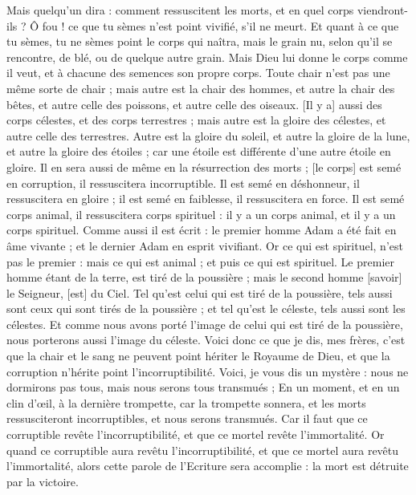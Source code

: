 \begin{multicols}{2}
Mais quelqu'un dira : comment ressuscitent les morts, et en quel corps viendront-ils ?
Ô fou ! ce que tu sèmes n'est point vivifié, s'il ne meurt.
Et quant à ce que tu sèmes, tu ne sèmes point le corps qui naîtra, mais le grain nu, selon qu'il se rencontre, de blé, ou de quelque autre grain.
Mais Dieu lui donne le corps comme il veut, et à chacune des semences son propre corps.
Toute chair n'est pas une même sorte de chair ; mais autre est la chair des hommes, et autre la chair des bêtes, et autre celle des poissons, et autre celle des oiseaux.
[Il y a] aussi des corps célestes, et des corps terrestres ; mais autre est la gloire des célestes, et autre celle des terrestres.
Autre est la gloire du soleil, et autre la gloire de la lune, et autre la gloire des étoiles ; car une étoile est différente d'une autre étoile en gloire.
Il en sera aussi de même en la résurrection des morts ; [le corps] est semé en corruption, il ressuscitera incorruptible.
Il est semé en déshonneur, il ressuscitera en gloire ; il est semé en faiblesse, il ressuscitera en force.
Il est semé corps animal, il ressuscitera corps spirituel : il y a un corps animal, et il y a un corps spirituel.
Comme aussi il est écrit : le premier homme Adam a été fait en âme vivante ; et le dernier Adam en esprit vivifiant.
Or ce qui est spirituel, n'est pas le premier : mais ce qui est animal ; et puis ce qui est spirituel.
Le premier homme étant de la terre, est tiré de la poussière ; mais le second homme [savoir] le Seigneur, [est] du Ciel.
Tel qu'est celui qui est tiré de la poussière, tels aussi sont ceux qui sont tirés de la poussière ; et tel qu'est le céleste, tels aussi sont les célestes.
Et comme nous avons porté l'image de celui qui est tiré de la poussière, nous porterons aussi l'image du céleste.
Voici donc ce que je dis, mes frères, c'est que la chair et le sang ne peuvent point hériter le Royaume de Dieu, et que la corruption n'hérite point l'incorruptibilité.
Voici, je vous dis un mystère : nous ne dormirons pas tous, mais nous serons tous transmués ;
En un moment, et en un clin d'œil, à la dernière trompette, car la trompette sonnera, et les morts ressusciteront incorruptibles, et nous serons transmués.
Car il faut que ce corruptible revête l'incorruptibilité, et que ce mortel revête l'immortalité.
Or quand ce corruptible aura revêtu l'incorruptibilité, et que ce mortel aura revêtu l'immortalité, alors cette parole de l'Ecriture sera accomplie : la mort est détruite par la victoire.

\end{multicols}
